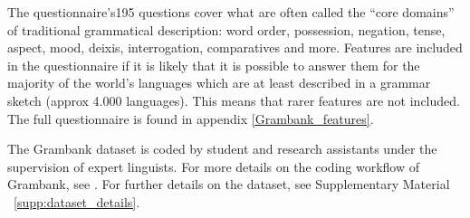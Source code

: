 \documentclass[a4paper,10pt]{article} %
\begin{document}
 


The questionnaire's195 questions cover what are often called the ``core domains'' of traditional grammatical description: word order, possession, negation, tense, aspect, mood, deixis, interrogation, comparatives and more. Features are included in the questionnaire if it is likely that it is possible to answer them for the majority of the world's languages which are at least described in a grammar sketch (approx 4.000 languages). This means that rarer features are not included. The full questionnaire is found in appendix \ref{Grambank_features}. 

The Grambank dataset is coded by student and research assistants under the supervision of expert linguists. For more details on the coding workflow of Grambank, see \citet{slingerland2020coding}. For further details on the dataset, see Supplementary Material ~\ref{supp:dataset_details}.

\end{document}
